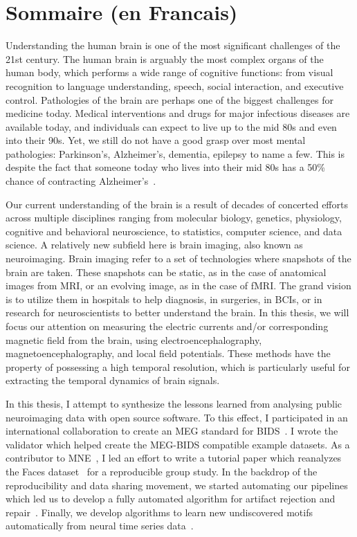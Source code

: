 \chapter{Sommaire (en Francais)}
\label{chapter:sommaire}
\pagestyle{mainmatter}

Understanding the human brain is one of the most significant challenges of the 21st century. The human brain is arguably the most complex  organs of the human body, which performs a wide range of cognitive functions: from visual recognition to language understanding, speech, social interaction, and executive control. Pathologies of the brain are perhaps one of the biggest challenges for medicine today. Medical interventions and drugs for major infectious diseases are available today, and individuals can expect to live up to the mid 80s and even into their 90s. Yet, we still do not have a good grasp over most mental pathologies: Parkinson's, Alzheimer's, dementia, epilepsy to name a few. This is despite the fact that someone today who lives into their mid 80s has a 50\% chance of contracting Alzheimer's~\citep{alzheimer20162016}.

Our current understanding of the brain is a result of decades of concerted efforts across multiple disciplines ranging from molecular biology, genetics, physiology, cognitive and behavioral neuroscience, to statistics, computer science, and data science. A relatively new subfield here is brain imaging, also known as neuroimaging. Brain imaging refer to a set of technologies where  snapshots of the brain are taken. These snapshots can be static, as in the case of anatomical images from \ac{MRI}, or an evolving image, as in the case of \ac{fMRI}. The grand vision is to utilize them in hospitals to help diagnosis, in surgeries, in \acp{BCI}, or in research for neuroscientists to better understand the brain. 
In this thesis, we will focus our attention on measuring the electric currents and/or corresponding magnetic field from the brain, using electroencephalography, magnetoencephalography, and local field potentials. 
These methods have the property of possessing a high temporal resolution, which is particularly useful for extracting the temporal dynamics of brain signals.

In this thesis, I attempt to synthesize the lessons learned from analysing public neuroimaging data with open source software. To this effect, I participated in an international collaboration to create an \ac{MEG} standard for  \ac{BIDS}~\citep{niso2018meg}. I wrote the validator which helped create the MEG-BIDS compatible example datasets. As a contributor to MNE~\citep{gramfort2013meg}, I led an effort to write a tutorial paper which reanalyzes the Faces dataset~\citep{wakeman2015multi} for a reproducible group study. In the backdrop of the reproducibility and data sharing movement, we started automating our pipelines which led us to develop a fully automated algorithm for artifact rejection and repair~\citep{jas2016automated, jas2017autoreject}. Finally, we develop algorithms to learn new undiscovered motifs automatically from neural time series data~\citep{jas2017learning}. 

